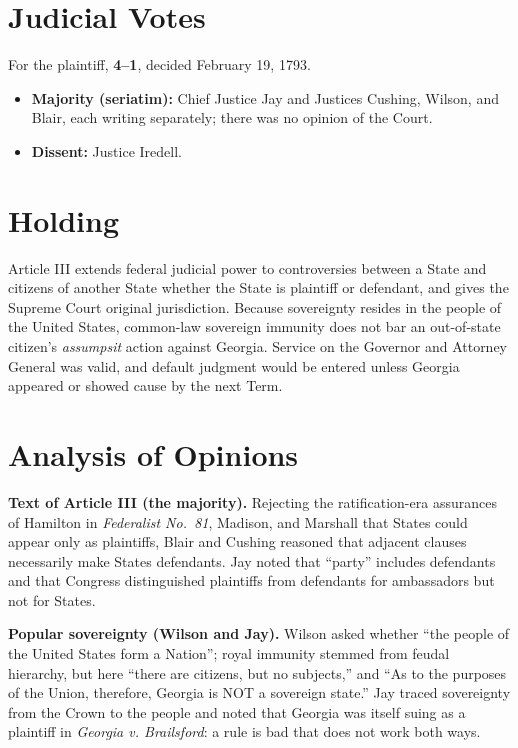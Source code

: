 \documentclass[12pt]{article}
\begin{document}
\section{Judicial Votes}

For the plaintiff, \textbf{4--1}, decided February 19, 1793.
\begin{itemize}
\item \textbf{Majority (seriatim):} Chief Justice Jay and Justices Cushing, Wilson, and Blair, each writing separately; there was no opinion of the Court.
\item \textbf{Dissent:} Justice Iredell.
\end{itemize}

\section{Holding}

Article III extends federal judicial power to controversies between a State and citizens of another State whether the State is plaintiff or defendant, and gives the Supreme Court original jurisdiction. Because sovereignty resides in the people of the United States, common-law sovereign immunity does not bar an out-of-state citizen's \emph{assumpsit} action against Georgia. Service on the Governor and Attorney General was valid, and default judgment would be entered unless Georgia appeared or showed cause by the next Term.

\section{Analysis of Opinions}

\textbf{Text of Article III (the majority).} Rejecting the ratification-era assurances of Hamilton in \emph{Federalist No.~81}, Madison, and Marshall that States could appear only as plaintiffs, Blair and Cushing reasoned that adjacent clauses necessarily make States defendants. Jay noted that ``party'' includes defendants and that Congress distinguished plaintiffs from defendants for ambassadors but not for States.

\textbf{Popular sovereignty (Wilson and Jay).} Wilson asked whether ``the people of the United States form a Nation''; royal immunity stemmed from feudal hierarchy, but here ``there are citizens, but no subjects,'' and ``As to the purposes of the Union, therefore, Georgia is NOT a sovereign state.'' Jay traced sovereignty from the Crown to the people and noted that Georgia was itself suing as a plaintiff in \emph{Georgia v. Brailsford}: a rule is bad that does not work both ways.
\end{document}
